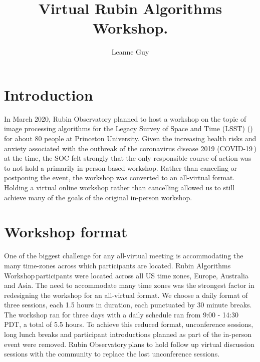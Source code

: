 \documentclass[DM,authoryear,toc]{lsstdoc}
\title[Virtual Rubin Algorithms Workshop]{Virtual Rubin Algorithms Workshop.}
\author{%
Leanne Guy
}
\date{\vcsDate}
\newcommand{\cvd}{COVID-19\,}
\newcommand{\raw}{Rubin Algorithms Workshop\,}
\newcommand{\rubin}{Rubin Observatory\,}
\begin{document}
\maketitle


\section{Introduction} 

In March 2020, Rubin Observatory planned to host a workshop on the topic of image processing algorithms for the Legacy Survey of Space and Time (LSST) (\cite{RAW2020}) for about 80 people at Princeton University.  
Given the increasing health risks and anxiety associated with the outbreak of the coronavirus disease 2019 (\cvd) at the time, the SOC felt strongly that the only responsible course of action was to not hold a primarily in-person based workshop. 
Rather than canceling or postponing the event, the workshop was converted to an all-virtual format. Holding a virtual online workshop rather than cancelling allowed us to still achieve many of the goals of the  original in-person workshop.

\section{Workshop format} 
One of the biggest challenge for any all-virtual meeting is accommodating the many time-zones across which participants are located.
\raw participants were located across all US time zones, Europe, Australia and Asia. 
The need to accommodate many time zones was the strongest factor in redesigning the workshop for an all-virtual format. 
We choose a daily format of three sessions, each 1.5 hours in duration, each punctuated by 30 minute breaks.  
The workshop ran for three days with a daily schedule ran from 9:00 - 14:30 PDT, a total of 5.5 hours.
To achieve this reduced format, unconference sessions, long lunch breaks and participant introductions planned as part of the in-person event were removed. \rubin plans to hold follow up virtual discussion sessions with the community to replace the lost unconference sessions. 
\end{document}
